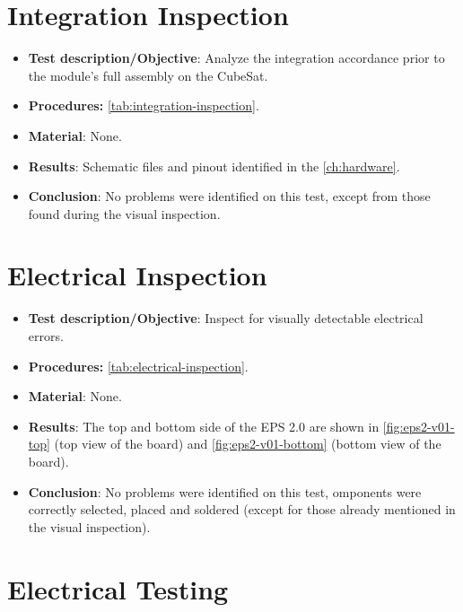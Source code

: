 \section{Integration Inspection}

\begin{itemize}
    \item \textbf{Test description/Objective}: Analyze the integration accordance prior to the module’s full assembly on the CubeSat.
    \item \textbf{Procedures:} \autoref{tab:integration-inspection}.
    \item \textbf{Material}: None.
    \item \textbf{Results}: Schematic files and pinout identified in the \autoref{ch:hardware}. 
    \item \textbf{Conclusion}: No problems were identified on this test, except from those found during the visual inspection.
\end{itemize}


\section{Electrical Inspection}

\begin{itemize}
    \item \textbf{Test description/Objective}: Inspect for visually detectable electrical errors.
    \item \textbf{Procedures:} \autoref{tab:electrical-inspection}.
    \item \textbf{Material}: None.
    \item \textbf{Results}: The top and bottom side of the EPS 2.0 are shown in \autoref{fig:eps2-v01-top} (top view of the board) and \autoref{fig:eps2-v01-bottom} (bottom view of the board).
    \item \textbf{Conclusion}: No problems were identified on this test, omponents were correctly selected, placed and soldered (except for those already mentioned in the visual inspection).
\end{itemize}


\section{Electrical Testing}

